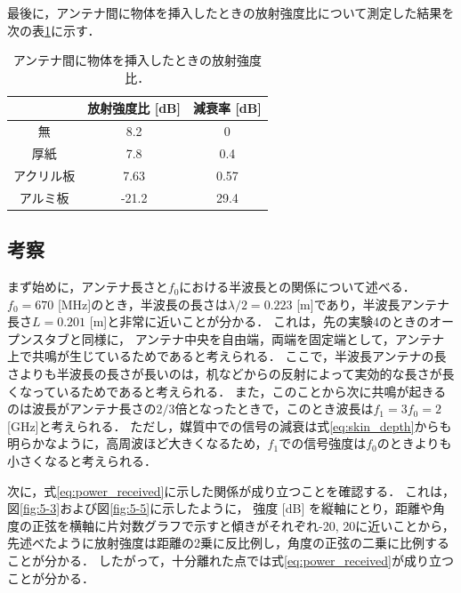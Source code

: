 \documentclass[uplatex,dvipdfmx,a4j,12pt]{jsarticle}
\begin{document}
最後に，アンテナ間に物体を挿入したときの放射強度比について測定した結果を次の表\ref{table:5-2}に示す．

\begin{table}[H]
    \centering
    \caption{アンテナ間に物体を挿入したときの放射強度比．}
    \label{table:5-2}
    \begin{tabular}{ccc}
        \hline
        & 放射強度比 [dB] & 減衰率 [dB]\\
        \hline
        \hline
        無 & 8.2 & 0 \\
        厚紙 & 7.8 & 0.4\\
        アクリル板 & 7.63 & 0.57\\
        アルミ板 & -21.2 & 29.4\\
        \hline
    \end{tabular}
\end{table}


\subsection{考察}
まず始めに，アンテナ長さと$f_0$における半波長との関係について述べる．
$f_0 = 670$ [MHz]のとき，半波長の長さは$\lambda / 2 = 0.223$ [m]であり，半波長アンテナ長さ$L = 0.201$ [m]と非常に近いことが分かる．
これは，先の実験4のときのオープンスタブと同様に，
アンテナ中央を自由端，両端を固定端として，アンテナ上で共鳴が生じているためであると考えられる．
ここで，半波長アンテナの長さよりも半波長の長さが長いのは，机などからの反射によって実効的な長さが長くなっているためであると考えられる．
また，このことから次に共鳴が起きるのは波長がアンテナ長さの$2/3$倍となったときで，このとき波長は$f_1 = 3f_0 = 2$ [GHz]と考えられる．
ただし，媒質中での信号の減衰は式\ref{eq:skin_depth}からも明らかなように，高周波ほど大きくなるため，$f_1$での信号強度は$f_0$のときよりも小さくなると考えられる．

次に，式\eqref{eq:power_received}に示した関係が成り立つことを確認する．
これは，図\ref{fig:5-3}および図\ref{fig:5-5}に示したように，
強度 [dB] を縦軸にとり，距離や角度の正弦を横軸に片対数グラフで示すと傾きがそれぞれ-20, 20に近いことから，
先述べたように放射強度は距離の2乗に反比例し，角度の正弦の二乗に比例することが分かる．
したがって，十分離れた点では式\eqref{eq:power_received}が成り立つことが分かる．
\end{document}
